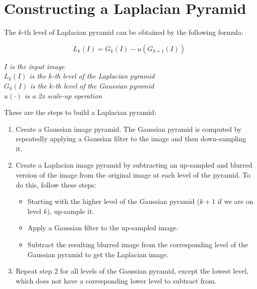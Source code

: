 \documentclass{article}
\begin{document}
\newpage

\section*{Constructing a Laplacian Pyramid}

The $k$-th level of Laplacian pyramid can be obtained by the following formula:

\begin{equation*}
    L_k(I) = G_k(I) - u(G_{k+1}(I))
\end{equation*}

\begin{center}
    \textit{$I$ is the input image} \\
    \textit{$L_k(I)$ is the $k$-th level of the Laplacian pyramid} \\
    \textit{$G_k(I)$ is the $k$-th level of the Gaussian pyramid} \\
    \textit{$u(\cdot)$ is a 2x scale-up operation}
\end{center}

These are the steps to build a Laplacian pyramid:
\begin{enumerate}
    \item Create a Gaussian image pyramid. The Gaussian pyramid is computed by repeatedly applying a Gaussian filter to the image and then down-sampling it.
    \item Create a Laplacian image pyramid by subtracting an up-sampled and blurred version of the image from the original image at each level of the pyramid. To do this, follow these steps:
    \begin{itemize}
        \item Starting with the higher level of the Gaussian pyramid ($k + 1$ if we are on level $k$), up-sample it.
        \item Apply a Gaussian filter to the up-sampled image.
        \item Subtract the resulting blurred image from the corresponding level of the Gaussian pyramid to get the Laplacian image.        
    \end{itemize}
    \item Repeat step 2 for all levels of the Gaussian pyramid, except the lowest level, which does not have a corresponding lower level to subtract from.
\end{enumerate}

\newpage
\end{document}
